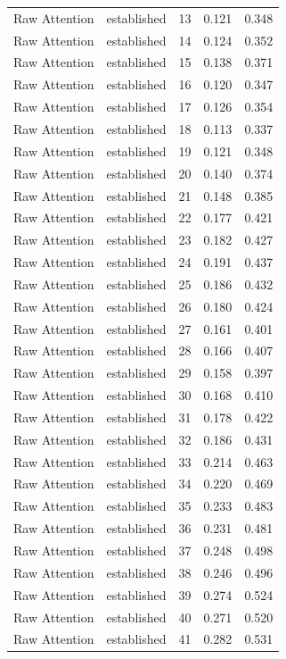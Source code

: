 \begin{tabular}{llrrr}
Raw Attention & established & 13 & 0.121 & 0.348 \\
Raw Attention & established & 14 & 0.124 & 0.352 \\
Raw Attention & established & 15 & 0.138 & 0.371 \\
Raw Attention & established & 16 & 0.120 & 0.347 \\
Raw Attention & established & 17 & 0.126 & 0.354 \\
Raw Attention & established & 18 & 0.113 & 0.337 \\
Raw Attention & established & 19 & 0.121 & 0.348 \\
Raw Attention & established & 20 & 0.140 & 0.374 \\
Raw Attention & established & 21 & 0.148 & 0.385 \\
Raw Attention & established & 22 & 0.177 & 0.421 \\
Raw Attention & established & 23 & 0.182 & 0.427 \\
Raw Attention & established & 24 & 0.191 & 0.437 \\
Raw Attention & established & 25 & 0.186 & 0.432 \\
Raw Attention & established & 26 & 0.180 & 0.424 \\
Raw Attention & established & 27 & 0.161 & 0.401 \\
Raw Attention & established & 28 & 0.166 & 0.407 \\
Raw Attention & established & 29 & 0.158 & 0.397 \\
Raw Attention & established & 30 & 0.168 & 0.410 \\
Raw Attention & established & 31 & 0.178 & 0.422 \\
Raw Attention & established & 32 & 0.186 & 0.431 \\
Raw Attention & established & 33 & 0.214 & 0.463 \\
Raw Attention & established & 34 & 0.220 & 0.469 \\
Raw Attention & established & 35 & 0.233 & 0.483 \\
Raw Attention & established & 36 & 0.231 & 0.481 \\
Raw Attention & established & 37 & 0.248 & 0.498 \\
Raw Attention & established & 38 & 0.246 & 0.496 \\
Raw Attention & established & 39 & 0.274 & 0.524 \\
Raw Attention & established & 40 & 0.271 & 0.520 \\
Raw Attention & established & 41 & 0.282 & 0.531 \\

\end{tabular}
